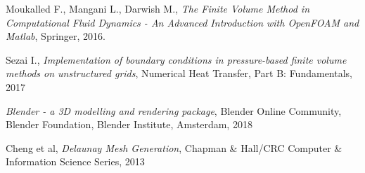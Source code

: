 \documentclass[11pt,letterpaper,titlepage]{article}
\numberwithin{equation}{section}
\begin{document}
\newpage
{}
\begin{thebibliography}{1}
    
     Moukalled F., Mangani L., Darwish M., {\em The Finite Volume Method in Computational Fluid Dynamics - An Advanced Introduction with OpenFOAM and Matlab}, Springer, 2016.
    
     Sezai I., {\em Implementation of boundary conditions in pressure-based finite volume methods on unstructured grids}, Numerical Heat Transfer, Part B: Fundamentals, 2017
    
     {\em Blender - a 3D modelling and rendering package}, Blender Online Community, Blender Foundation, Blender Institute, Amsterdam, 2018
    
     Cheng et al, {\em Delaunay Mesh Generation}, Chapman \& Hall/CRC Computer \& Information Science Series, 2013
    
    
\end{thebibliography}
\end{document}
